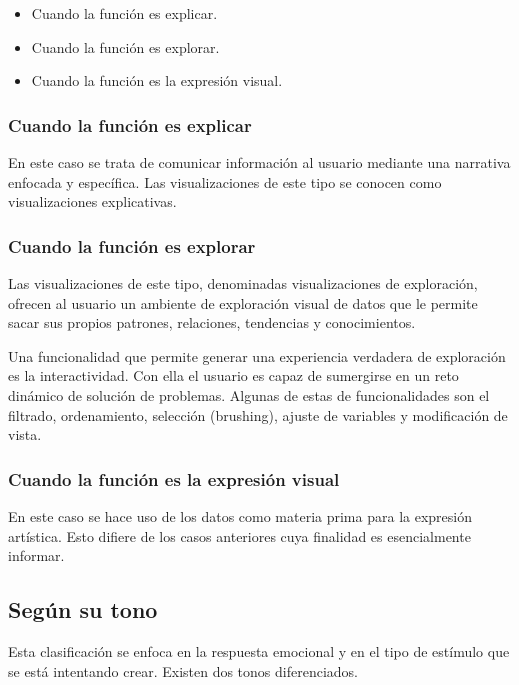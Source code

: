 \begin{itemize}
  \item Cuando la función es explicar.
  \item Cuando la función es explorar.
  \item Cuando la función es la expresión visual.
\end{itemize}

\subsubsection{Cuando la función es explicar}

En este caso se trata de comunicar información al usuario mediante una narrativa enfocada y específica. Las visualizaciones de este tipo se conocen como visualizaciones explicativas.

\subsubsection{Cuando la función es explorar}

Las visualizaciones de este tipo, denominadas visualizaciones de exploración, ofrecen al usuario un ambiente de exploración visual de datos que le permite sacar sus propios patrones, relaciones, tendencias y conocimientos.

Una funcionalidad que permite generar una experiencia verdadera de exploración es la interactividad. Con ella el usuario es capaz de sumergirse en un reto dinámico de solución de problemas. Algunas de estas de funcionalidades son el filtrado, ordenamiento, selección (brushing), ajuste de variables y modificación de vista.

\subsubsection{Cuando la función es la expresión visual}

En este caso se hace uso de los datos como materia prima para la expresión artística. Esto difiere de los casos anteriores cuya finalidad es esencialmente informar.

\subsection{Según su tono}

Esta clasificación se enfoca en la respuesta emocional y en el tipo de estímulo que se está intentando crear. Existen dos tonos diferenciados.

